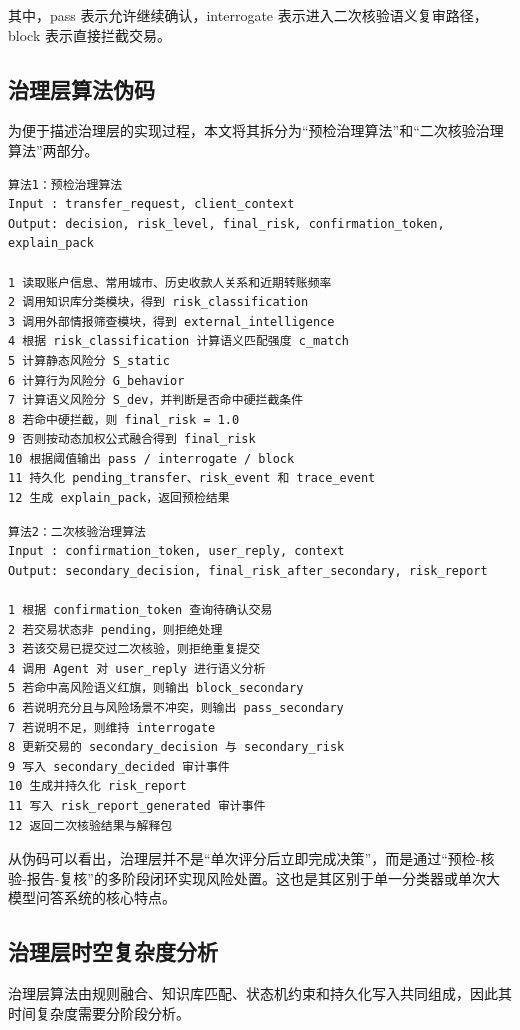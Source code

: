 \documentclass{xduugthesis}
\begin{document}
其中，pass 表示允许继续确认，interrogate 表示进入二次核验语义复审路径，block 表示直接拦截交易。

\subsection{治理层算法伪码}

为便于描述治理层的实现过程，本文将其拆分为“预检治理算法”和“二次核验治理算法”两部分。

\begin{verbatim}
算法1：预检治理算法
Input : transfer_request, client_context
Output: decision, risk_level, final_risk, confirmation_token, explain_pack

1 读取账户信息、常用城市、历史收款人关系和近期转账频率
2 调用知识库分类模块，得到 risk_classification
3 调用外部情报筛查模块，得到 external_intelligence
4 根据 risk_classification 计算语义匹配强度 c_match
5 计算静态风险分 S_static
6 计算行为风险分 G_behavior
7 计算语义风险分 S_dev，并判断是否命中硬拦截条件
8 若命中硬拦截，则 final_risk = 1.0
9 否则按动态加权公式融合得到 final_risk
10 根据阈值输出 pass / interrogate / block
11 持久化 pending_transfer、risk_event 和 trace_event
12 生成 explain_pack，返回预检结果
\end{verbatim}

\begin{verbatim}
算法2：二次核验治理算法
Input : confirmation_token, user_reply, context
Output: secondary_decision, final_risk_after_secondary, risk_report

1 根据 confirmation_token 查询待确认交易
2 若交易状态非 pending，则拒绝处理
3 若该交易已提交过二次核验，则拒绝重复提交
4 调用 Agent 对 user_reply 进行语义分析
5 若命中高风险语义红旗，则输出 block_secondary
6 若说明充分且与风险场景不冲突，则输出 pass_secondary
7 若说明不足，则维持 interrogate
8 更新交易的 secondary_decision 与 secondary_risk
9 写入 secondary_decided 审计事件
10 生成并持久化 risk_report
11 写入 risk_report_generated 审计事件
12 返回二次核验结果与解释包
\end{verbatim}

从伪码可以看出，治理层并不是“单次评分后立即完成决策”，而是通过“预检-核验-报告-复核”的多阶段闭环实现风险处置。这也是其区别于单一分类器或单次大模型问答系统的核心特点。

\subsection{治理层时空复杂度分析}

治理层算法由规则融合、知识库匹配、状态机约束和持久化写入共同组成，因此其时间复杂度需要分阶段分析。
\end{document}
